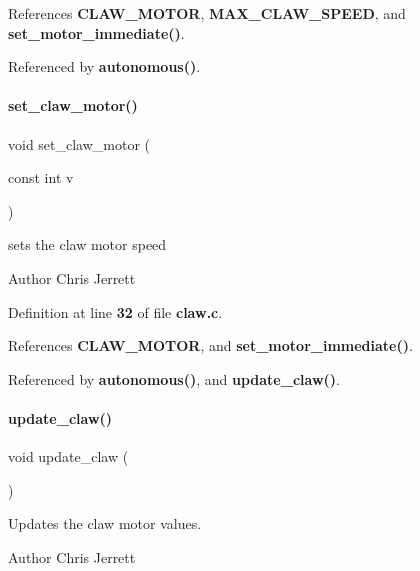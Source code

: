 References \textbf{ C\+L\+A\+W\+\_\+\+M\+O\+T\+OR}, \textbf{ M\+A\+X\+\_\+\+C\+L\+A\+W\+\_\+\+S\+P\+E\+ED}, and \textbf{ set\+\_\+motor\+\_\+immediate()}.



Referenced by \textbf{ autonomous()}.

\mbox{\label{claw_8h_a3a57f998b1884d39b0cc786689f7086f}} 
\paragraph{set\+\_\+claw\+\_\+motor()}
{\footnotesize\ttfamily void set\+\_\+claw\+\_\+motor (\begin{DoxyParamCaption}\item[{const int}]{v }\end{DoxyParamCaption})}



sets the claw motor speed 

\begin{DoxyAuthor}{Author}
Chris Jerrett 
\end{DoxyAuthor}


Definition at line \textbf{ 32} of file \textbf{ claw.\+c}.



References \textbf{ C\+L\+A\+W\+\_\+\+M\+O\+T\+OR}, and \textbf{ set\+\_\+motor\+\_\+immediate()}.



Referenced by \textbf{ autonomous()}, and \textbf{ update\+\_\+claw()}.

\mbox{\label{claw_8h_a0122b78972344264b8a276a559cfce4a}} 
\paragraph{update\+\_\+claw()}
{\footnotesize\ttfamily void update\+\_\+claw (\begin{DoxyParamCaption}{ }\end{DoxyParamCaption})}



Updates the claw motor values. 

\begin{DoxyAuthor}{Author}
Chris Jerrett 
\end{DoxyAuthor}


